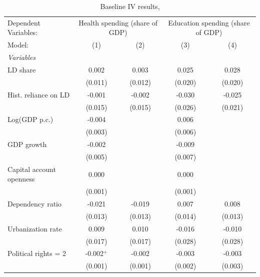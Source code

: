 
\begin{table}[htbp]
   \caption{\label{tab:results_baseline_iv_overall_} Baseline IV results,}
   \centering
   \begin{tabular}{lcccc}
      \tabularnewline \midrule \midrule
      Dependent Variables: & \multicolumn{2}{c}{Health spending (share of GDP)} & \multicolumn{2}{c}{Education spending (share of GDP)}\\
      Model:                     & (1)          & (2)          & (3)      & (4)\\  
      \midrule
      \emph{Variables}\\
      LD share                   & 0.002        & 0.003        & 0.025    & 0.028\\   
                                 & (0.011)      & (0.012)      & (0.020)  & (0.020)\\   
      Hist. reliance on LD       & -0.001       & -0.002       & -0.030   & -0.025\\   
                                 & (0.015)      & (0.015)      & (0.026)  & (0.021)\\   
      Log(GDP p.c.)              & -0.004       &              & 0.006    &   \\   
                                 & (0.003)      &              & (0.006)  &   \\   
      GDP growth                 & -0.002       &              & -0.009   &   \\   
                                 & (0.005)      &              & (0.007)  &   \\   
      Capital account openness   & 0.000        &              & 0.000    &   \\   
                                 & (0.001)      &              & (0.001)  &   \\   
      Dependency ratio           & -0.021       & -0.019       & 0.007    & 0.008\\   
                                 & (0.013)      & (0.013)      & (0.014)  & (0.013)\\   
      Urbanization rate          & 0.009        & 0.010        & -0.016   & -0.010\\   
                                 & (0.017)      & (0.017)      & (0.028)  & (0.028)\\   
      Political rights = 2       & -0.002$^{+}$ & -0.002       & -0.003   & -0.003\\   
                                 & (0.001)      & (0.001)      & (0.002)  & (0.003)\\   

\end{tabular}
\end{table}
